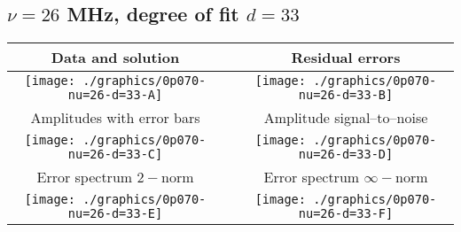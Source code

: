

% 

\clearpage{}
\break{}

\subsection{$\nu = 26$ MHz, degree of fit $d = 33$}

\begin{table}[h]
    \begin{center}
        \begin{tabular}{ccc}
            Data and solution & \quad & Residual errors \\\hline
            \texttt{[image: ./graphics/0p070-nu=26-d=33-A]} &&
            \texttt{[image: ./graphics/0p070-nu=26-d=33-B]} \\[15pt]
            Amplitudes with error bars && Amplitude signal--to--noise \\\hline
            \texttt{[image: ./graphics/0p070-nu=26-d=33-C]} &&
            \texttt{[image: ./graphics/0p070-nu=26-d=33-D]} \\[15pt]
            Error spectrum $2-$norm && Error spectrum $\infty-$norm \\\hline
            \texttt{[image: ./graphics/0p070-nu=26-d=33-E]} &&
            \texttt{[image: ./graphics/0p070-nu=26-d=33-F]} \\[15pt]
        \end{tabular}
    \end{center}
\label{fig:elev=70, nu=26}
\end{table}



\endinput
